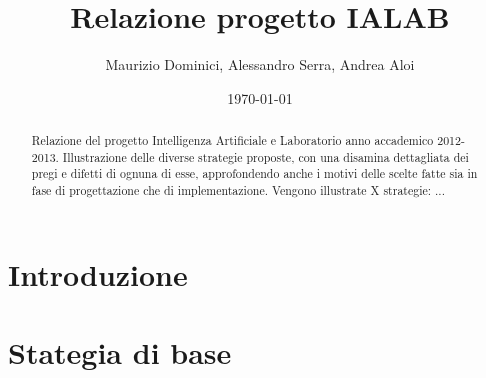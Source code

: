 \documentclass[a4paper,12pt, twoside]{report}
\title{Relazione progetto IALAB}
\author{Maurizio Dominici, Alessandro Serra, Andrea Aloi}
\date{\today}
\begin{document}
\maketitle
 
\begin{abstract}
Relazione del progetto Intelligenza Artificiale e Laboratorio anno accademico 2012-2013.
Illustrazione delle diverse strategie proposte, con una disamina dettagliata dei pregi e difetti di ognuna di esse, approfondendo anche i motivi delle scelte fatte sia in fase di progettazione che di implementazione. Vengono illustrate X strategie: ...
\end{abstract}

\newpage
 
\tableofcontents
\clearpage{\pagestyle{empty}\cleardoublepage}

\chapter{Introduzione} \label{cap:intro}


\chapter{Stategia di base} \label{cap:base}


%
\end{document}
